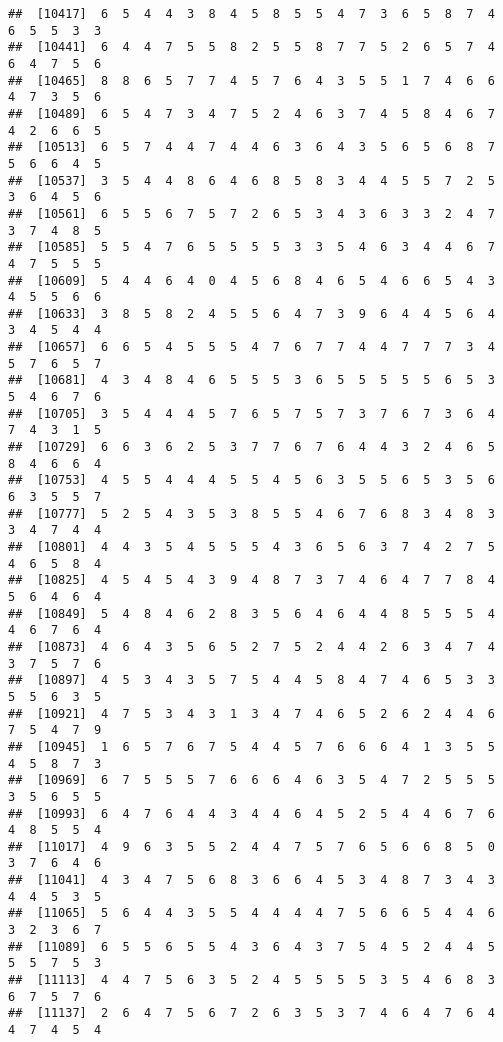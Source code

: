 \documentclass[
]{book}
\begin{document}
\begin{verbatim}
##  [10417]  6  5  4  4  3  8  4  5  8  5  5  4  7  3  6  5  8  7  4  6  5  5  3  3
##  [10441]  6  4  4  7  5  5  8  2  5  5  8  7  7  5  2  6  5  7  4  6  4  7  5  6
##  [10465]  8  8  6  5  7  7  4  5  7  6  4  3  5  5  1  7  4  6  6  4  7  3  5  6
##  [10489]  6  5  4  7  3  4  7  5  2  4  6  3  7  4  5  8  4  6  7  4  2  6  6  5
##  [10513]  6  5  7  4  4  7  4  4  6  3  6  4  3  5  6  5  6  8  7  5  6  6  4  5
##  [10537]  3  5  4  4  8  6  4  6  8  5  8  3  4  4  5  5  7  2  5  3  6  4  5  6
##  [10561]  6  5  5  6  7  5  7  2  6  5  3  4  3  6  3  3  2  4  7  3  7  4  8  5
##  [10585]  5  5  4  7  6  5  5  5  5  3  3  5  4  6  3  4  4  6  7  4  7  5  5  5
##  [10609]  5  4  4  6  4  0  4  5  6  8  4  6  5  4  6  6  5  4  3  4  5  5  6  6
##  [10633]  3  8  5  8  2  4  5  5  6  4  7  3  9  6  4  4  5  6  4  3  4  5  4  4
##  [10657]  6  6  5  4  5  5  5  4  7  6  7  7  4  4  7  7  7  3  4  5  7  6  5  7
##  [10681]  4  3  4  8  4  6  5  5  5  3  6  5  5  5  5  5  6  5  3  5  4  6  7  6
##  [10705]  3  5  4  4  4  5  7  6  5  7  5  7  3  7  6  7  3  6  4  7  4  3  1  5
##  [10729]  6  6  3  6  2  5  3  7  7  6  7  6  4  4  3  2  4  6  5  8  4  6  6  4
##  [10753]  4  5  5  4  4  4  5  5  4  5  6  3  5  5  6  5  3  5  6  6  3  5  5  7
##  [10777]  5  2  5  4  3  5  3  8  5  5  4  6  7  6  8  3  4  8  3  3  4  7  4  4
##  [10801]  4  4  3  5  4  5  5  5  4  3  6  5  6  3  7  4  2  7  5  4  6  5  8  4
##  [10825]  4  5  4  5  4  3  9  4  8  7  3  7  4  6  4  7  7  8  4  5  6  4  6  4
##  [10849]  5  4  8  4  6  2  8  3  5  6  4  6  4  4  8  5  5  5  4  4  6  7  6  4
##  [10873]  4  6  4  3  5  6  5  2  7  5  2  4  4  2  6  3  4  7  4  3  7  5  7  6
##  [10897]  4  5  3  4  3  5  7  5  4  4  5  8  4  7  4  6  5  3  3  5  5  6  3  5
##  [10921]  4  7  5  3  4  3  1  3  4  7  4  6  5  2  6  2  4  4  6  7  5  4  7  9
##  [10945]  1  6  5  7  6  7  5  4  4  5  7  6  6  6  4  1  3  5  5  4  5  8  7  3
##  [10969]  6  7  5  5  5  7  6  6  6  4  6  3  5  4  7  2  5  5  5  3  5  6  5  5
##  [10993]  6  4  7  6  4  4  3  4  4  6  4  5  2  5  4  4  6  7  6  4  8  5  5  4
##  [11017]  4  9  6  3  5  5  2  4  4  7  5  7  6  5  6  6  8  5  0  3  7  6  4  6
##  [11041]  4  3  4  7  5  6  8  3  6  6  4  5  3  4  8  7  3  4  3  4  4  5  3  5
##  [11065]  5  6  4  4  3  5  5  4  4  4  4  7  5  6  6  5  4  4  6  3  2  3  6  7
##  [11089]  6  5  5  6  5  5  4  3  6  4  3  7  5  4  5  2  4  4  5  5  5  7  5  3
##  [11113]  4  4  7  5  6  3  5  2  4  5  5  5  5  3  5  4  6  8  3  6  7  5  7  6
##  [11137]  2  6  4  7  5  6  7  2  6  3  5  3  7  4  6  4  7  6  4  4  7  4  5  4

\end{verbatim}
\end{document}
